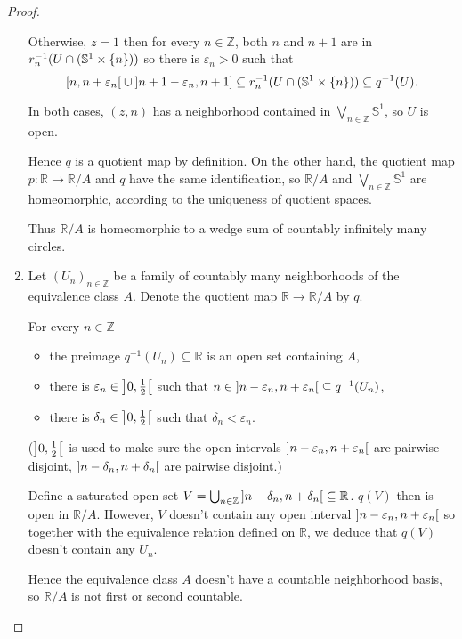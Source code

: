 \begin{proof}
\begin{enumerate}[label={(\alph*)}]
		      Otherwise, $z = 1$ then for every $n\in\mathbb{Z}$, both $n$ and $n+1$ are in $r_{n}^{-1}(U \cap (\mathbb{S}^{1}\times\left\{{n}\right\}))$ so there is $\varepsilon_{n} > 0$ such that
		      \begin{equation*}
			      \left[{n, n + \varepsilon_{n}}\right[ \cup \left]{n+1 - \varepsilon_{n}, n+1}\right] \subseteq r_{n}^{-1}(U \cap (\mathbb{S}^{1}\times\left\{{n}\right\})) \subseteq q^{-1}(U).
		      \end{equation*}

		      In both cases, $(z, n)$ has a neighborhood contained in $\bigvee_{n\in\mathbb{Z}}\mathbb{S}^{1}$, so $U$ is open.

		      Hence $q$ is a quotient map by definition. On the other hand, the quotient map $p: \mathbb{R} \to \mathbb{R}/A$ and $q$ have the same identification, so $\mathbb{R}/A$ and $\bigvee_{n\in \mathbb{Z}}\mathbb{S}^{1}$ are homeomorphic, according to the uniqueness of quotient spaces.

		      Thus $\mathbb{R}/A$ is homeomorphic to a wedge sum of countably infinitely many circles.
		\item Let ${(U_{n})}_{n\in\mathbb{Z}}$ be a family of countably many neighborhoods of the equivalence class $A$. Denote the quotient map $\mathbb{R}\to \mathbb{R}/A$ by $q$.

		      For every $n\in\mathbb{Z}$
		      \begin{itemize}
			      \item the preimage $q^{-1}(U_{n}) \subseteq \mathbb{R}$ is an open set containing $A$,
			      \item there is $\varepsilon_{n} \in \left]{0, \frac{1}{2}}\right[$ such that $n \in \left]{n - \varepsilon_{n}, n + \varepsilon_{n}}\right[ \subseteq q^{-1}(U_{n})$,
			      \item there is $\delta_{n} \in \left]{0, \frac{1}{2}}\right[$ such that $\delta_{n} < \varepsilon_{n}$.
		      \end{itemize}

		      ($\left]{0, \frac{1}{2}}\right[$ is used to make sure the open intervals $\left]{n - \varepsilon_{n}, n + \varepsilon_{n}}\right[$ are pairwise disjoint, $\left]{n - \delta_{n}, n + \delta_{n}}\right[$ are pairwise disjoint.)

		      Define a saturated open set $V = \bigcup_{n\in\mathbb{Z}} \left]{n - \delta_{n}, n + \delta_{n}}\right[ \subseteq \mathbb{R}$. $q(V)$ then is open in $\mathbb{R}/A$. However, $V$ doesn't contain any open interval $\left]{n - \varepsilon_{n}, n + \varepsilon_{n}}\right[$ so together with the equivalence relation defined on $\mathbb{R}$, we deduce that $q(V)$ doesn't contain any $U_{n}$.

		      Hence the equivalence class $A$ doesn't have a countable neighborhood basis, so $\mathbb{R}/A$ is not first or second countable.
	\end{enumerate}
\end{proof}

